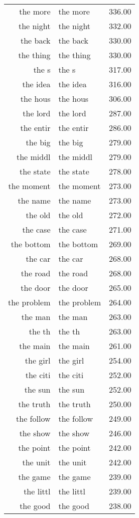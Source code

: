 \begin{table}[ht]
\begin{tabular}{rlr}
  the more & the more & 336.00 \\ 
  the night & the night & 332.00 \\ 
  the back & the back & 330.00 \\ 
  the thing & the thing & 330.00 \\ 
  the s & the s & 317.00 \\ 
  the idea & the idea & 316.00 \\ 
  the hous & the hous & 306.00 \\ 
  the lord & the lord & 287.00 \\ 
  the entir & the entir & 286.00 \\ 
  the big & the big & 279.00 \\ 
  the middl & the middl & 279.00 \\ 
  the state & the state & 278.00 \\ 
  the moment & the moment & 273.00 \\ 
  the name & the name & 273.00 \\ 
  the old & the old & 272.00 \\ 
  the case & the case & 271.00 \\ 
  the bottom & the bottom & 269.00 \\ 
  the car & the car & 268.00 \\ 
  the road & the road & 268.00 \\ 
  the door & the door & 265.00 \\ 
  the problem & the problem & 264.00 \\ 
  the man & the man & 263.00 \\ 
  the th & the th & 263.00 \\ 
  the main & the main & 261.00 \\ 
  the girl & the girl & 254.00 \\ 
  the citi & the citi & 252.00 \\ 
  the sun & the sun & 252.00 \\ 
  the truth & the truth & 250.00 \\ 
  the follow & the follow & 249.00 \\ 
  the show & the show & 246.00 \\ 
  the point & the point & 242.00 \\ 
  the unit & the unit & 242.00 \\ 
  the game & the game & 239.00 \\ 
  the littl & the littl & 239.00 \\ 
  the good & the good & 238.00 \\ 

\end{tabular}
\end{table}

